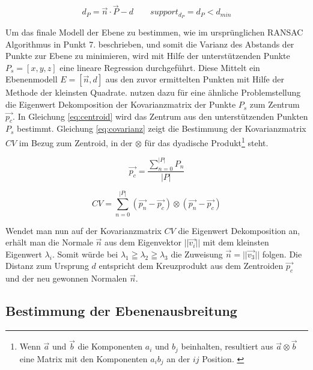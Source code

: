\begin{equation} \label{eq:plane-distance}
d_P = \vec{n} \cdot \vec{P} - d \qquad support_{d_P} = d_P < d_{min}
\end{equation}

Um das finale Modell der Ebene zu bestimmen, wie im ursprünglichen RANSAC Algorithmus in Punkt 7. beschrieben, und somit die Varianz des Abstands der Punkte zur Ebene zu minimieren, wird mit Hilfe der unterstützenden Punkte \(P_{s}=\left[x,y,z\right]\) eine lineare Regression durchgeführt. Diese Mittelt ein Ebenenmodell \(E=\left[\vec{n}, d\right]\) aus den zuvor ermittelten Punkten mit Hilfe der Methode der kleinsten Quadrate. \citet{hoppe1992surface} nutzen dazu für eine ähnliche Problemstellung die Eigenwert Dekomposition der Kovarianzmatrix der Punkte \(P_{s}\) zum Zentrum \(\vec{p_{c}}\). In Gleichung \ref{eq:centroid} wird das Zentrum aus den unterstützenden Punkten \(P_{s}\) bestimmt. Gleichung \ref{eq:covarianz} zeigt die Bestimmung der Kovarianzmatrix \(CV\) im Bezug zum Zentroid, in der \(\otimes\) für das dyadische Produkt\footnote{Wenn \(\vec{a}\) und \(\vec{b}\) die Komponenten \(a_i\) und \(b_j\) beinhalten, resultiert aus \(\vec{a} \otimes \vec{b}\) eine Matrix mit den Komponenten \(a_ib_j\) an der \(ij\) Position. \citep{hoppe1992surface}} steht.

\begin{equation} \label{eq:centroid}
\vec{p_{c}} = \frac{\sum_{n=0}^{|P|} P_{n}}{|P|}
\end{equation}

\begin{equation} \label{eq:covarianz}
CV = \sum_{n=0}^{|P|} ( \vec{p_{n}}- \vec{p_{c}}) \otimes ( \vec{p_{n}}- \vec{p_{c}})
\end{equation}

Wendet man nun auf der Kovarianzmatrix \(CV\) die Eigenwert Dekomposition an, erhält man die Normale \(\vec{n}\) aus dem Eigenvektor \(||\vec{v_i}||\) mit dem kleinsten Eigenwert \(\lambda_i\). Somit würde bei \(\lambda_1 \geqq \lambda_2 \geqq \lambda_3\) die Zuweisung \(\vec{n} = ||\vec{v_3}||\) folgen. Die Distanz zum Ursprung \(d\) entspricht dem Kreuzprodukt aus dem Zentroiden \(\vec{p_c}\) und der neu gewonnen Normalen \(\vec{n}\). \citep{hoppe1992surface} 

\subsection{Bestimmung der Ebenenausbreitung}

